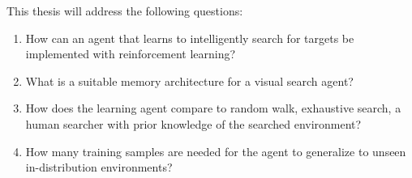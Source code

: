 % 
% 
% 
% 
% 
% 
% 
% 

This thesis will address the following questions:

\begin{enumerate}
  \item \label{itm:rq1} How can an agent that learns to intelligently search for targets be implemented with reinforcement learning?
  \item What is a suitable memory architecture for a visual search agent?
  \item \label{itm:rq2} How does the learning agent compare to random walk, exhaustive search, a human searcher with prior knowledge of the searched environment?
  \item \label{itm:rq3} How many training samples are needed for the agent to generalize to unseen in-distribution environments?
\end{enumerate}

